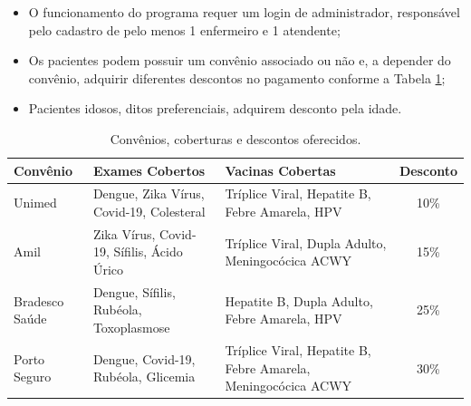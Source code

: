 \documentclass{article}
\begin{document}
\begin{itemize}
    \item O funcionamento do programa requer um login de administrador, responsável pelo cadastro de pelo menos 1 enfermeiro e 1 atendente;
    \item Os pacientes podem possuir um convênio associado ou não e, a depender do convênio, adquirir diferentes descontos no pagamento conforme a Tabela \ref{tab:convênios_coberturas_descontos};
    \item Pacientes idosos, ditos preferenciais, adquirem desconto pela idade.
\end{itemize}

        \begin{table}[H]
            \centering
            \caption{Convênios, coberturas e descontos oferecidos.}
            \label{tab:convênios_coberturas_descontos}
            \begin{tabularx}{\textwidth}{|X|X|X|c|}
            \hline
            Convênio & Exames Cobertos & Vacinas Cobertas & Desconto \\
            \hline
            Unimed & Dengue, Zika Vírus, Covid-19, Colesteral & Tríplice Viral, Hepatite B, Febre Amarela, HPV & 10\% \\
            \hline
            Amil & Zika Vírus, Covid-19, Sífilis, Ácido Úrico & Tríplice Viral, Dupla Adulto, Meningocócica ACWY & 15\% \\
            \hline
            Bradesco Saúde & Dengue, Sífilis, Rubéola, Toxoplasmose & Hepatite B, Dupla Adulto, Febre Amarela, HPV & 25\% \\
            \hline
            Porto Seguro & Dengue, Covid-19, Rubéola, Glicemia & Tríplice Viral, Hepatite B, Febre Amarela, Meningocócica ACWY & 30\% \\
            \hline
            \end{tabularx}
        \end{table}
    

\newpage
\end{document}
